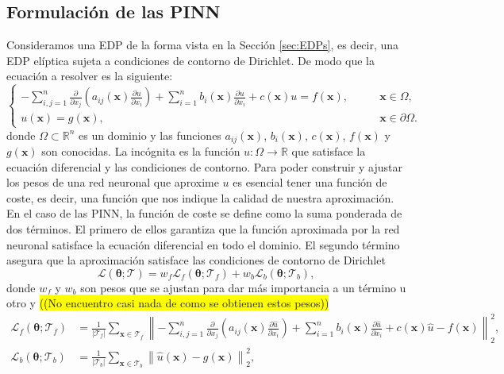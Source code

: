 \documentclass[a4paper,11pt,spanish, twoside, leqno]{tfg-uam}
\theoremstyle{definition}
\begin{document}
\subsection{Formulación de las PINN}
Consideramos una EDP de la forma vista en la Sección \ref{sec:EDPs}, es decir, una EDP elíptica sujeta a condiciones de contorno de Dirichlet. De modo que la ecuación a resolver es la siguiente: 
\begin{equation} 
    \begin{cases} -\sum_{i,j=1}^{n} \frac{\partial}{\partial x_j}\left( a_{ij}(\mathbf{x})\frac{\partial u}{\partial x_i}\right) + \sum_{i=1}^{n} b_i(\mathbf{x})\frac{\partial u}{\partial x_i} + c(\mathbf{x})u = f(\mathbf{x}), &\qquad \mathbf{x}\in\Omega,\\ u(\mathbf{x}) = g(\mathbf{x}), &\qquad \mathbf{x}\in\partial\Omega. 
    \end{cases} 
\end{equation} 
donde $\Omega \subset \mathbb{R}^n$ es un dominio y las funciones $a_{ij}(\mathbf{x})$, $b_i(\mathbf{x})$, $c(\mathbf{x})$, $f(\mathbf{x})$ y $g(\mathbf{x})$ son conocidas. La incógnita es la función $u: \Omega \to \mathbb{R}$ que satisface la ecuación diferencial y las condiciones de contorno. Para poder construir y ajustar los pesos de una red neuronal que aproxime $u$ es esencial tener una función de coste, es decir, una función que nos indique la calidad de nuestra aproximación. En el caso de las PINN, la función de coste se define como la suma ponderada de dos términos. El primero de ellos garantiza que la función aproximada por la red neuronal satisface la ecuación diferencial en todo el dominio. El segundo término asegura que la aproximación satisface las condiciones de contorno de Dirichlet
\begin{equation} \label{eq:L_PINN}
    \mathcal{L}(\boldsymbol{\theta}; \mathcal{T}) = w_f \mathcal{L}_f(\boldsymbol{\theta}; \mathcal{T}_f) + w_b \mathcal{L}_b(\boldsymbol{\theta}; \mathcal{T}_b),
\end{equation}
donde $w_f$ y $w_b$ son pesos que se ajustan para dar más importancia a un término u otro y \colorbox{yellow}{((No encuentro casi nada de como se obtienen estos pesos))}
\begin{align*}
    \mathcal{L}_f(\boldsymbol{\theta}; \mathcal{T}_f) &= \frac{1}{|\mathcal{T}_f|} \sum_{\mathbf{x} \in \mathcal{T}_f} \left\| -\sum_{i,j=1}^{n} \frac{\partial}{\partial x_j}\left( a_{ij}(\mathbf{x})\frac{\partial \hat{u}}{\partial x_i}\right) + \sum_{i=1}^{n} b_i(\mathbf{x})\frac{\partial \hat{u}}{\partial x_i} + c(\mathbf{x})\hat{u} - f(\mathbf{x}) \right\|_2^2, \\ 
    \mathcal{L}_b(\boldsymbol{\theta}; \mathcal{T}_b) &= \frac{1}{|\mathcal{T}_b|} \sum_{\mathbf{x} \in \mathcal{T}_b} \left\| \hat{u} (\mathbf{x}) - g(\mathbf{x})\right\|_2^2,
\end{align*}
\end{document}
